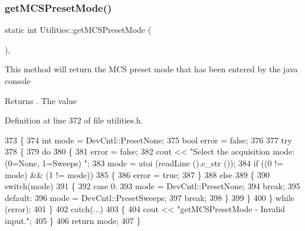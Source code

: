 \subsubsection{\texorpdfstring{get\+M\+C\+S\+Preset\+Mode()}{getMCSPresetMode()}}
{\footnotesize\ttfamily static int Utilities\+::get\+M\+C\+S\+Preset\+Mode (\begin{DoxyParamCaption}{ }\end{DoxyParamCaption})\hspace{0.3cm}{\ttfamily [inline]}, {\ttfamily [static]}}

This method will return the M\+CS preset mode that has been entered by the java console \begin{DoxyReturn}{Returns}
. The value 
\end{DoxyReturn}


Definition at line 372 of file utilities.\+h.


\begin{DoxyCode}
373     \{
374         \textcolor{keywordtype}{int} mode = DevCntl::PresetNone;
375         \textcolor{keywordtype}{bool} error = \textcolor{keyword}{false};
376         
377         \textcolor{keywordflow}{try}
378         \{
379             \textcolor{keywordflow}{do} 
380             \{
381                 error = \textcolor{keyword}{false};
382                 cout << \textcolor{stringliteral}{"Select the acquisition mode: (0=None, 1=Sweeps) "};
383                 mode = atoi (readLine ().c\_str ());
384                 \textcolor{keywordflow}{if} ((0 != mode) && (1 != mode))
385                 \{
386                     error = \textcolor{keyword}{true};
387                 \}
388                 \textcolor{keywordflow}{else} 
389                 \{
390                     \textcolor{keywordflow}{switch}(mode) 
391                     \{
392                     \textcolor{keywordflow}{case} 0:
393                         mode = DevCntl::PresetNone;
394                         \textcolor{keywordflow}{break};
395                     \textcolor{keywordflow}{default}:
396                         mode = DevCntl::PresetSweeps;
397                         \textcolor{keywordflow}{break};
398                     \}
399                 \}
400             \} \textcolor{keywordflow}{while} (error);
401         \}
402         \textcolor{keywordflow}{catch}(...) 
403         \{
404             cout << \textcolor{stringliteral}{"getMCSPresetMode - Invalid input."};
405         \}
406         \textcolor{keywordflow}{return} mode;
407     \}
\end{DoxyCode}
\mbox{\label{class_utilities_a13331eb352ca5cce3fc25a5af99ea87c_a13331eb352ca5cce3fc25a5af99ea87c}} 
